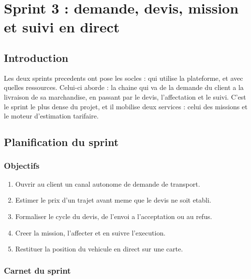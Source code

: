 \chapter{Sprint 3 : demande, devis, mission et suivi en direct}
\label{chap:sprint3}

\section*{Introduction}

Les deux sprints precedents ont pose les socles : qui utilise la
plateforme, et avec quelles ressources. Celui-ci aborde  : la chaine qui va de la demande du client a la
livraison de sa marchandise, en passant par le devis, l'affectation et le
suivi. C'est le sprint le plus dense du projet, et il mobilise deux
services : celui des missions et le moteur d'estimation tarifaire.

\section{Planification du sprint}

\subsection{Objectifs}

\begin{enumerate}
  \item Ouvrir au client un canal autonome de demande de transport.
  \item Estimer le prix d'un trajet avant meme que le devis ne soit
    etabli.
  \item Formaliser le cycle du devis, de l'envoi a l'acceptation ou au
    refus.
  \item Creer la mission, l'affecter et en suivre l'execution.
  \item Restituer la position du vehicule en direct sur une carte.
\end{enumerate}

\subsection{Carnet du sprint}

